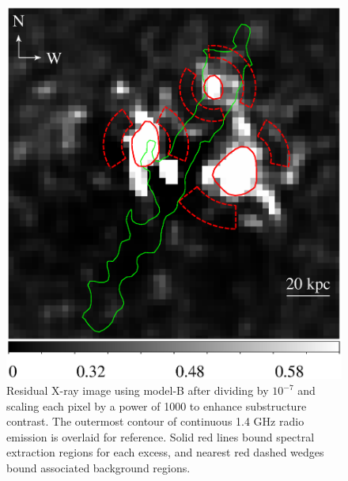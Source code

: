 \begin{figure}
  \begin{center}
    \begin{minipage}{0.5\linewidth}
      \includegraphics*[width=\textwidth]{exspec.ps}
    \end{minipage}
    \caption{Residual X-ray image using model-B after dividing by
      $10^{-7}$ and scaling each pixel by a power of 1000 to enhance
      substructure contrast. The outermost contour of continuous 1.4
      GHz radio emission is overlaid for reference. Solid red lines
      bound spectral extraction regions for each excess, and nearest
      red dashed wedges bound associated background regions.}
    \label{fig:exspec}
  \end{center}
\end{figure}

